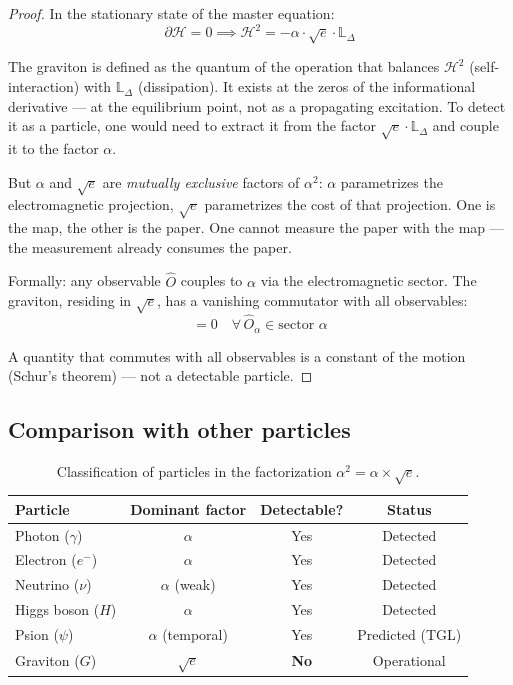 \documentclass[12pt,a4paper,twoside]{article}
\newcommand{\alphaii}{\alpha^{2}}
\newcommand{\psion}{\psi}
\newcommand{\psion}{\psi}
\begin{document}
\begin{proof}
In the stationary state of the master equation:
\begin{equation}
\partial\mathcal{H} = 0 \implies \mathcal{H}^2 = -\alpha \cdot \sqrt{e} \cdot \mathbb{L}_\Delta
\end{equation}

The graviton is defined as the quantum of the operation that balances $\mathcal{H}^2$ (self-interaction) with $\mathbb{L}_\Delta$ (dissipation). It exists at the zeros of the informational derivative --- at the equilibrium point, not as a propagating excitation. To detect it as a particle, one would need to extract it from the factor $\sqrt{e} \cdot \mathbb{L}_\Delta$ and couple it to the factor $\alpha$.

But $\alpha$ and $\sqrt{e}$ are \textit{mutually exclusive} factors of $\alphaii$: $\alpha$ parametrizes the electromagnetic projection, $\sqrt{e}$ parametrizes the cost of that projection. One is the map, the other is the paper. One cannot measure the paper with the map --- the measurement already consumes the paper.

Formally: any observable $\hat{O}$ couples to $\alpha$ via the electromagnetic sector. The graviton, residing in $\sqrt{e}$, has a vanishing commutator with all observables:
\begin{equation}
[\hat{G}_{\text{graviton}}, \hat{O}_\alpha] = 0 \quad \forall\, \hat{O}_\alpha \in \text{sector } \alpha
\end{equation}

A quantity that commutes with all observables is a constant of the motion (Schur's theorem) --- not a detectable particle.
\end{proof}

\subsection{Comparison with other particles}

\begin{table}[H]
\centering
\caption{Classification of particles in the factorization $\alphaii = \alpha \times \sqrt{e}$.}
\label{tab:particulas}
\begin{tabular}{lccc}
\toprule
\textbf{Particle} & \textbf{Dominant factor} & \textbf{Detectable?} & \textbf{Status} \\
\midrule
Photon ($\gamma$) & $\alpha$ & Yes & Detected \\
Electron ($e^-$) & $\alpha$ & Yes & Detected \\
Neutrino ($\nu$) & $\alpha$ (weak) & Yes & Detected \\
Higgs boson ($H$) & $\alpha$ & Yes & Detected \\
Psion ($\psion$) & $\alpha$ (temporal) & Yes & Predicted (TGL) \\
\midrule
Graviton ($G$) & $\sqrt{e}$ & \textbf{No} & Operational \\
\bottomrule
\end{tabular}
\end{table}
\end{document}

